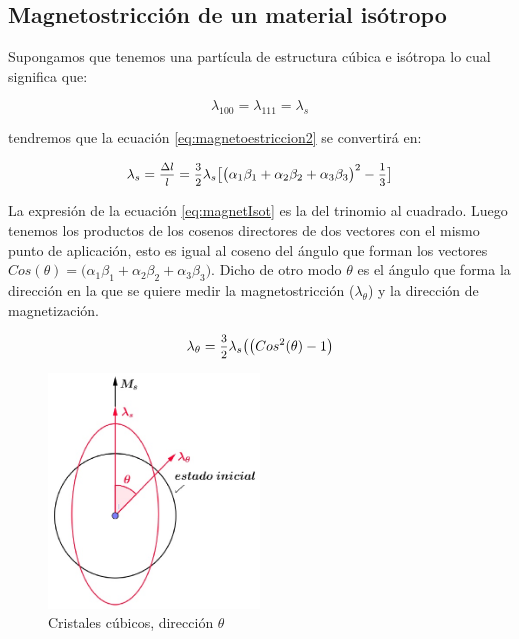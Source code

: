 \subsection{Magnetostricción de un material isótropo}
Supongamos que tenemos una partícula de estructura cúbica e isótropa lo cual significa que:

\begin{equation}
\lambda_{100}=\lambda_{111}=\lambda_{s}
\end{equation}

tendremos que la ecuación \ref{eq:magnetoestriccion2} se convertirá en:

\begin{equation}
	\lambda_{s}=\mfrac{\Delta l}{l}=\mfrac{3}{2}\lambda_{s} \big[ \big(\alpha_{1}\beta_{1}+ \alpha_{2}\beta_{2}+\alpha_{3}\beta_{3} \big)^{2} -\mfrac{1}{3} \big] 
		\label{eq:magnetIsot}
\end{equation}

La expresión de la ecuación \ref{eq:magnetIsot} es la del trinomio al cuadrado. Luego tenemos los productos de los cosenos directores de dos vectores con el mismo punto de aplicación, esto es igual al coseno del ángulo que forman los vectores ${Cos(\theta) = \big(\alpha_{1}\beta_{1}+ \alpha_{2}\beta_{2}+\alpha_{3}\beta_{3} \big)}$. Dicho de otro modo $\theta$ es el ángulo que forma la dirección en la que se quiere medir la magnetostricción ($\lambda_{\theta}$) y la dirección de magnetización.

\begin{equation}
	\lambda_{\theta}=\mfrac{3}{2}\lambda_{s} \big( \big( Cos^{2}(\theta)-1 \big) 
	\label{eq:magnetIsot2}
\end{equation}

\begin{figure}[H]
    \centering
    \includegraphics[width=0.5\textwidth]{./Figures/magnetoestriccionOtroCasoMas}
	\caption{Cristales cúbicos, dirección $\theta$}
	\label{fig:magnetoestriccionOtroCasoMas}
\end{figure}

